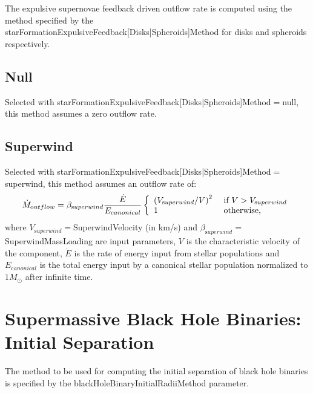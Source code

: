 The expulsive supernovae feedback driven outflow rate is computed using the method specified by the {\normalfont \ttfamily starFormationExpulsiveFeedback[Disks|Spheroids]Method} for disks and spheroids respectively.

\subsection{Null}

Selected with {\normalfont \ttfamily starFormationExpulsiveFeedback[Disks|Spheroids]Method}$=${\normalfont \ttfamily null}, this method assumes a zero outflow rate.

\subsection{Superwind}

Selected with {\normalfont \ttfamily starFormationExpulsiveFeedback[Disks|Spheroids]Method}$=${\normalfont \ttfamily superwind}, this method assumes an outflow rate of:
\begin{equation}
 \dot{M}_{\mathrm outflow} =  \beta_{\mathrm superwind} {\dot{E} \over E_{\mathrm canonical}} \left\{ \begin{array}{ll} \left( V_{\mathrm superwind}/V\right)^2 & \hbox{ if } V > V_{\mathrm superwind} \\ 1 & \hbox{ otherwise,} \end{array} \right.
\end{equation}
where $V_{\mathrm superwind}=${\normalfont {}SuperwindVelocity} (in km/s) and $\beta_{\mathrm superwind}=${\normalfont {}SuperwindMassLoading} are input parameters, $V$ is the characteristic velocity of the component, $\dot{E}$ is the rate of energy input from stellar populations and $E_{\mathrm canonical}$ is the total energy input by a canonical stellar population normalized to $1 M_\odot$ after infinite time.

\section{Supermassive Black Hole Binaries: Initial Separation}\label{sec:blackHoleBinaryInitialRadii}

The method to be used for computing the initial separation of black hole binaries is specified by the {\normalfont \ttfamily blackHoleBinaryInitialRadiiMethod} parameter.

